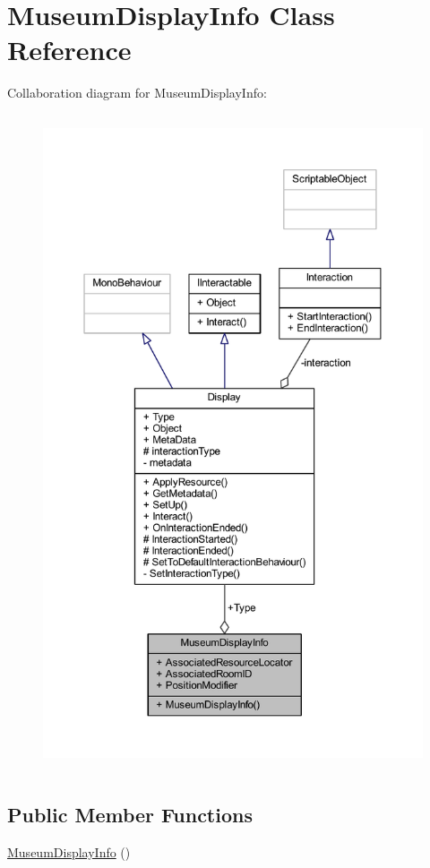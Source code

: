 \hypertarget{class_museum_display_info}{}\section{Museum\+Display\+Info Class Reference}
\label{class_museum_display_info}


Collaboration diagram for Museum\+Display\+Info\+:
\nopagebreak
\begin{figure}[H]
\begin{center}
\leavevmode
\includegraphics[height=550pt]{class_museum_display_info__coll__graph}
\end{center}
\end{figure}
\subsection*{Public Member Functions}
\begin{DoxyCompactItemize}
\item 
\mbox{\hyperlink{class_museum_display_info_a755099749d31cd5c6f06a2d0210832b9}{Museum\+Display\+Info}} ()
\end{DoxyCompactItemize}
